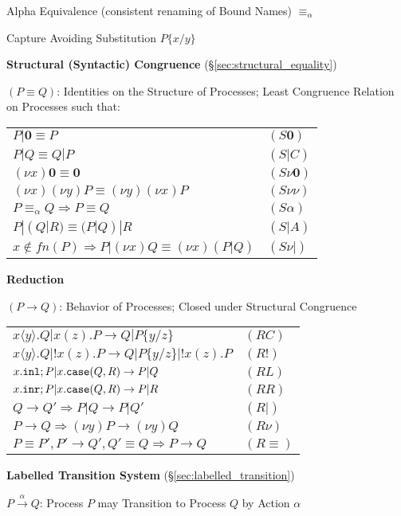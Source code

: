 Alpha Equivalence (consistent renaming of Bound Names) $\equiv_\alpha$

Capture Avoiding Substitution $P\{x/y\}$


\textbf{Structural (Syntactic) Congruence}
(\S\ref{sec:structural_equality})

$(P \equiv Q)$: Identities on the Structure of Processes; Least
Congruence Relation on Processes such that:

\begin{tabular}{l l}
  $P|\mathbf{0} \equiv P$ & $(S\mathbf{0})$ \\
  $P|Q \equiv Q|P$ & $(S|C)$ \\
  $(\nu x) \mathbf{0} \equiv \mathbf{0}$ & $(S \nu \mathbf{0})$ \\
  $(\nu x)(\nu y)P \equiv (\nu y)(\nu x)P$ & $(S\nu\nu)$ \\
  $P \equiv_\alpha Q \Rightarrow P \equiv Q$ & $(S\alpha)$ \\
  $P|(Q|R) \equiv (P|Q)|R$ & $(S|A)$ \\
  $x \notin fn(P) \Rightarrow P|(\nu x)Q \equiv (\nu x)(P|Q)$
  & $(S\nu|)$
\end{tabular}


\textbf{Reduction}

$(P \rightarrow Q)$: Behavior of Processes; Closed under Structural
Congruence

\begin{tabular}{l l}
  $x\langle y \rangle.Q | x(z).P \rightarrow Q | P \{y/z\}$
  & $(RC)$ \\
  $x\langle y \rangle.Q | !x(z).P \rightarrow Q | P \{y/z\} | !x(z).P$
  & $(R!)$ \\
  $x.\mathtt{inl}; P | x.\mathtt{case}(Q,R) \rightarrow P | Q$
  & $(RL)$ \\
  $x.\mathtt{inr}; P | x.\mathtt{case}(Q,R) \rightarrow P | R$
  & $(RR)$ \\
  $Q \rightarrow Q' \Rightarrow P|Q \rightarrow P|Q'$
  & $(R|)$ \\
  $P \rightarrow Q \Rightarrow (\nu y)P \rightarrow (\nu y)Q$
  & $(R\nu)$ \\
  $P \equiv P', P' \rightarrow Q', Q'
    \equiv Q \Rightarrow P \rightarrow Q$
  & $(R\equiv)$
\end{tabular}


\textbf{Labelled Transition System}
(\S\ref{sec:labelled_transition})

$P \xrightarrow{\alpha} Q$: Process $P$ may Transition to Process $Q$
by Action $\alpha$

